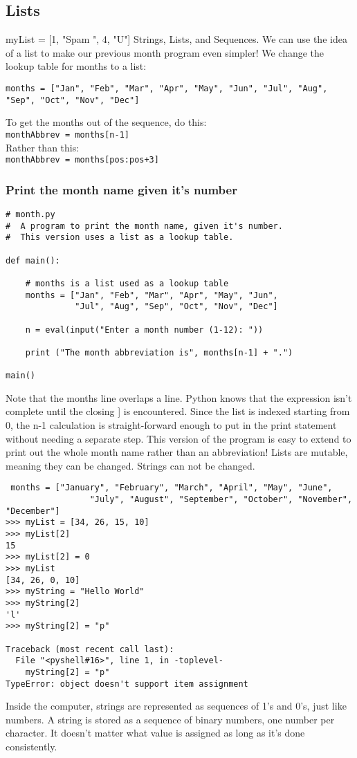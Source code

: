 \documentclass[12pt,a4paper,final,twoside,onecolumn,titlepage]{book}
\begin{document}
\subsection{Lists}
myList = [1, "Spam ", 4, "U"] Strings, Lists, and Sequences. We can use the idea of a list to make our previous month program even simpler! We change the lookup table for months to a list:
\begin{lstlisting}
months = ["Jan", "Feb", "Mar", "Apr", "May", "Jun", "Jul", "Aug", "Sep", "Oct", "Nov", "Dec"]
\end{lstlisting}
To get the months out of the sequence, do this: \\
\texttt{monthAbbrev = months[n-1]}\\
Rather than this:\\
\texttt{monthAbbrev = months[pos:pos+3]}

\subsubsection{Print the month name given it's number}
\begin{lstlisting}
# month.py
#  A program to print the month name, given it's number.
#  This version uses a list as a lookup table.

def main():
    
    # months is a list used as a lookup table
    months = ["Jan", "Feb", "Mar", "Apr", "May", "Jun",
              "Jul", "Aug", "Sep", "Oct", "Nov", "Dec"]
    
    n = eval(input("Enter a month number (1-12): "))

    print ("The month abbreviation is", months[n-1] + ".")

main()
\end{lstlisting}
Note that the months line overlaps a line. Python knows that the expression isn’t complete until the closing ] is encountered. Since the list is indexed starting from 0, the n-1 calculation is straight-forward enough to put in the print statement without needing a separate step. This version of the program is easy to extend to print out the whole month name rather than an abbreviation! 
Lists are mutable, meaning they can be changed. Strings can not be changed.
\begin{lstlisting}
 months = ["January", "February", "March", "April", "May", "June", 
                 "July", "August", "September", "October", "November", "December"]
>>> myList = [34, 26, 15, 10]
>>> myList[2]
15
>>> myList[2] = 0
>>> myList
[34, 26, 0, 10]
>>> myString = "Hello World"
>>> myString[2]
'l'
>>> myString[2] = "p"

Traceback (most recent call last):
  File "<pyshell#16>", line 1, in -toplevel-
    myString[2] = "p"
TypeError: object doesn't support item assignment
\end{lstlisting}
Inside the computer, strings are represented as sequences of 1’s and 0’s, just like numbers. A string is stored as a sequence of binary numbers, one number per character. It doesn’t matter what value is assigned as long as it’s done consistently.
\end{document}
